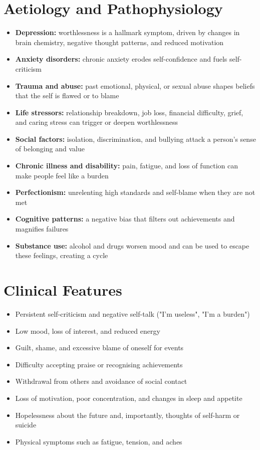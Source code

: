 \section*{Aetiology and Pathophysiology}
\begin{itemize}
    \item \textbf{Depression:} worthlessness is a hallmark symptom, driven by changes in brain chemistry, negative thought patterns, and reduced motivation
    \item \textbf{Anxiety disorders:} chronic anxiety erodes self-confidence and fuels self-criticism
    \item \textbf{Trauma and abuse:} past emotional, physical, or sexual abuse shapes beliefs that the self is flawed or to blame
    \item \textbf{Life stressors:} relationship breakdown, job loss, financial difficulty, grief, and caring stress can trigger or deepen worthlessness
    \item \textbf{Social factors:} isolation, discrimination, and bullying attack a person's sense of belonging and value
    \item \textbf{Chronic illness and disability:} pain, fatigue, and loss of function can make people feel like a burden
    \item \textbf{Perfectionism:} unrelenting high standards and self-blame when they are not met
    \item \textbf{Cognitive patterns:} a negative bias that filters out achievements and magnifies failures
    \item \textbf{Substance use:} alcohol and drugs worsen mood and can be used to escape these feelings, creating a cycle
\end{itemize}

\section*{Clinical Features}
\begin{itemize}
    \item Persistent self-criticism and negative self-talk ("I'm useless", "I'm a burden")
    \item Low mood, loss of interest, and reduced energy
    \item Guilt, shame, and excessive blame of oneself for events
    \item Difficulty accepting praise or recognising achievements
    \item Withdrawal from others and avoidance of social contact
    \item Loss of motivation, poor concentration, and changes in sleep and appetite
    \item Hopelessness about the future and, importantly, thoughts of self-harm or suicide
    \item Physical symptoms such as fatigue, tension, and aches
\end{itemize}

